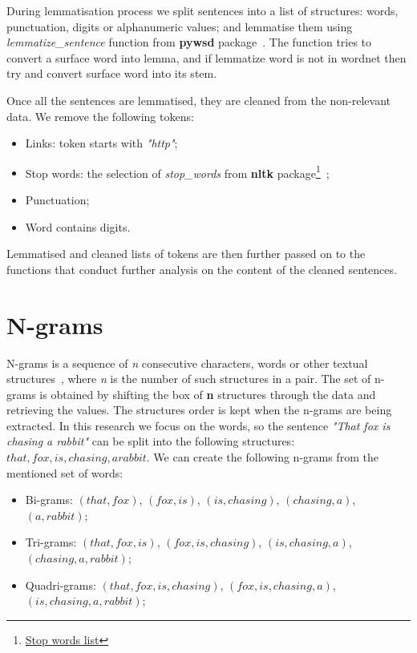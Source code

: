 During lemmatisation process we split sentences into a list of structures: words, punctuation, digits or alphanumeric values; and lemmatise them using \textit{lemmatize\_sentence} function from \textbf{pywsd} package~\cite{pywsd14}. The function tries to convert a surface word into lemma, and if lemmatize word is not in wordnet then try and convert surface word into its stem. 

Once all the sentences are lemmatised, they are cleaned from the non-relevant data. We remove the following tokens: 
\begin{itemize}
    \item Links: token starts with \textit{"http"};
    \item Stop words: the selection of \textit{stop\_words} from \textbf{nltk} package\footnote{\href{https://www.geeksforgeeks.org/removing-stop-words-nltk-python/}{Stop words list}}~\cite{nltk};
    \item Punctuation; 
    \item Word contains digits.
\end{itemize}

Lemmatised and cleaned lists of tokens are then further passed on to the functions that conduct further analysis on the content of the cleaned sentences. 

\section{N-grams}
N-grams is a sequence of \textit{n} consecutive characters, words or other textual structures~\cite{n-grams}, where \textit{n} is the number of such structures in a pair. The set of n-grams is obtained by shifting the box of \textbf{n} structures through the data and retrieving the values. The structures order is kept when the n-grams are being extracted. In this research we focus on the words, so the sentence \textit{"That fox is chasing a rabbit"} can be split into the following structures: ${that, fox, is, chasing, a rabbit}$. We can create the following n-grams from the mentioned set of words:
\begin{itemize}
    \item Bi-grams: $(that, fox)$, $(fox, is)$, $(is, chasing)$, $(chasing, a)$, $(a, rabbit)$; 
    \item Tri-grams: $(that, fox, is)$, $(fox, is, chasing)$, $(is, chasing, a)$, \\$(chasing, a, rabbit)$;
    \item Quadri-grams: $(that, fox, is, chasing)$, $(fox, is, chasing, a)$, \\$(is, chasing, a, rabbit)$;
\end{itemize}

